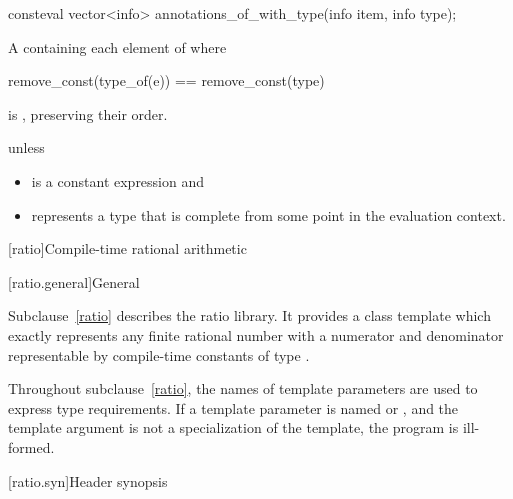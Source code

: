 %
\begin{itemdecl}
consteval vector<info> annotations_of_with_type(info item, info type);
\end{itemdecl}

\begin{itemdescr}
\pnum
\returns
A  containing each element  of 
where
\begin{codeblock}
remove_const(type_of(e)) == remove_const(type)
\end{codeblock}
is , preserving their order.

\pnum
\throws
{} unless
\begin{itemize}
\item
   is a constant expression and
\item
   represents a type that is complete
  from some point in the evaluation context.
\end{itemize}
\end{itemdescr}

[ratio]{Compile-time rational arithmetic}

[ratio.general]{General}

\pnum
{}%
Subclause~\ref{ratio} describes the ratio library. It provides a class template
 which exactly represents any finite rational number with a
numerator and denominator representable by compile-time constants of type
.

\pnum
Throughout subclause~\ref{ratio}, the names of template parameters are used to express
type requirements. If a template parameter is named  or ,
and the template argument is not a specialization of the  template,
the program is ill-formed.

[ratio.syn]{Header  synopsis}

